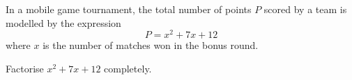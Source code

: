 \begin{question}
\noindent In a mobile game tournament, the total number of points $P$ scored by a team is modelled by the expression
\[
P = x^2 + 7x + 12
\]
where $x$ is the number of matches won in the bonus round.

\noindent Factorise $x^2 + 7x + 12$ completely.
\vspace{4cm}
\begin{flushright}
\end{flushright}
\end{question}